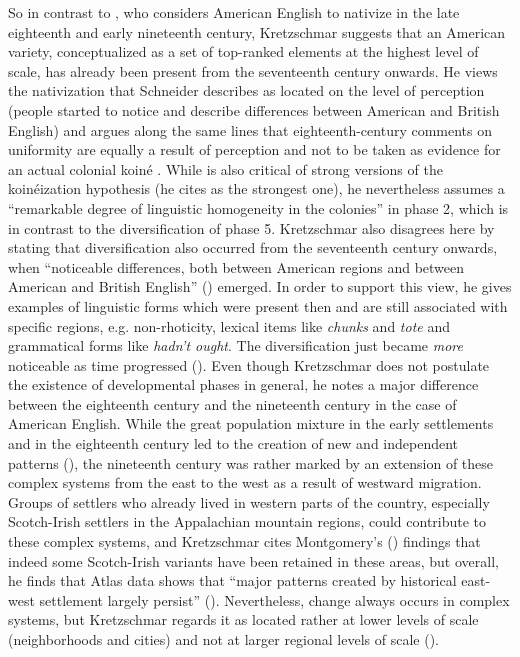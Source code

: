So in contrast to \citet{Schneider2007}, who considers American English to nativize in the late eighteenth and early nineteenth century, Kretzschmar suggests that an American variety, conceptualized as a set of top-ranked elements at the highest level of scale, has already been present from the seventeenth century onwards. He views the nativization that Schneider describes as located on the level of perception (people started to notice and describe differences between American and British English) and argues along the same lines that eighteenth-century comments on uniformity are equally a result of perception and not to be taken as evidence for an actual colonial koiné \citep[258--259]{Kretzschmar2015}. While \citet[270]{Schneider2007} is also critical of strong versions of the koinéization hypothesis (he cites \citealt{Dillard1975} as the strongest one), he nevertheless assumes a “remarkable degree of linguistic homogeneity in the colonies” in phase 2, which is in contrast to the diversification of phase 5. Kretzschmar also disagrees here by stating that diversification also occurred from the seventeenth century onwards, when “noticeable differences, both between American regions and between American and British English” (\citeyear[257]{Kretzschmar2015}) emerged. In order to support this view, he gives examples of linguistic forms which were present then and are still associated with specific regions, e.g. non-rhoticity, lexical items like \emph{chunks} and \emph{tote} and grammatical forms like \emph{hadn’t ought}. The diversification just became \emph{more} noticeable as time progressed (\citeyear[259]{Kretzschmar2015}). Even though Kretzschmar does not postulate the existence of developmental phases in general, he notes a major difference between the eighteenth century and the nineteenth century in the case of American English. While the great population mixture in the early settlements and in the eighteenth century led to the creation of new and independent patterns (\citeyear[259]{Kretzschmar2015}), the nineteenth century was rather marked by an extension of these complex systems from the east to the west as a result of westward migration. Groups of settlers who already lived in western parts of the country, especially Scotch-Irish settlers in the Appalachian mountain regions, could contribute to these complex systems, and Kretzschmar cites Montgomery's (\citeyear{Montgomery1989, Montgomery1991, Montgomery1997}) findings that indeed some Scotch-Irish variants have been retained in these areas, but overall, he finds that Atlas data shows that “major patterns created by historical east-west settlement largely persist” (\citeyear[261]{Kretzschmar2015}). Nevertheless, change always occurs in complex systems, but Kretzschmar regards it as located rather at lower levels of scale (neighborhoods and cities) and not at larger regional levels of scale (\citeyear[261]{Kretzschmar2015}).


